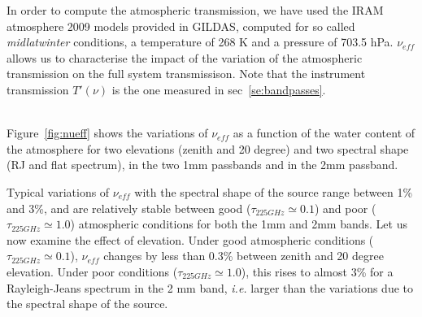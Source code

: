 In order to compute the atmospheric transmission, we have used
the IRAM atmosphere 2009 models provided in GILDAS, computed for
so called {\em midlatwinter} conditions, a temperature of 268 K  and a pressure of 703.5
hPa. $\nu_{eff}$ allows us to characterise the impact of the variation of
the atmospheric transmission on the full system transmissison.  Note
that the instrument transmission $T'(\nu)$ is the one measured in
sec~\ref{se:bandpasses}. 

\\


Figure~\ref{fig:nueff} shows the variations of
$\nu_{eff}$ as a function of the water content of the atmosphere for
two elevations (zenith and 20 degree) and two spectral shape (RJ and
flat spectrum), in the two 1mm passbands and in the 2mm passband. 

Typical variations of $\nu_{eff}$ with the spectral shape of the
source range between 1\% and 3\%, and are relatively stable between good
($\tau_{225GHz} \simeq 0.1$) and
poor  ($\tau_{225GHz} \simeq 1.0$) atmospheric conditions for both the
1mm and 2mm bands. Let us now examine the effect of elevation.
Under good atmospheric conditions ($\tau_{225GHz} \simeq 0.1$), $\nu_{eff}$ changes by
less than 0.3\% between zenith and 20 degree elevation. Under poor
conditions ($\tau_{225GHz} \simeq 1.0$), this rises to almost 3\% for
a Rayleigh-Jeans spectrum in the 2 mm band, {\it i.e.} larger than the
  variations due to the spectral shape of the source.




